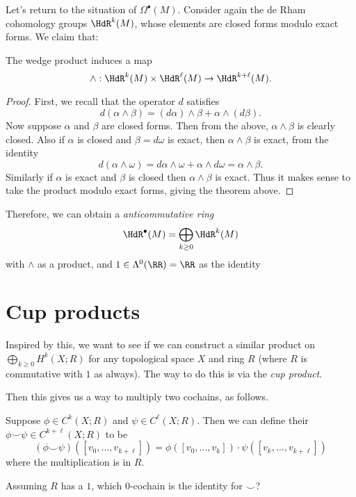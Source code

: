 Let's return to the situation of $\Omega^\bullet(M)$.
Consider again the de Rham cohomology groups $\HdR^k(M)$,
whose elements are closed forms modulo exact forms.
We claim that:
\begin{lemma}
	The wedge product induces a map
	\[ \wedge : \HdR^k(M) \times \HdR^\ell(M) \to \HdR^{k+\ell}(M). \]
\end{lemma}
\begin{proof}
	First, we recall that the operator $d$ satisfies
	\[
		d(\alpha \wedge \beta)
		= (d\alpha) \wedge \beta + \alpha \wedge (d\beta).
	\]
	Now suppose $\alpha$ and $\beta$ are closed forms.
	Then from the above, $\alpha \wedge \beta$ is clearly closed.
	Also if $\alpha$ is closed and $\beta = d\omega$ is exact,
	then $\alpha \wedge \beta$ is exact, from the identity
	\[ d(\alpha \wedge \omega)
		= d\alpha \wedge\omega + \alpha \wedge d\omega = \alpha \wedge \beta. \]
	Similarly if $\alpha$ is exact and $\beta$ is closed
	then $\alpha \wedge \beta$ is exact.
	Thus it makes sense to take the product modulo exact forms,
	giving the theorem above.
\end{proof}

Therefore, we can obtain a \emph{anticommutative ring}
\[ \HdR^\bullet(M) = \bigoplus_{k \ge 0} \HdR^k(M) \]
with $\wedge$ as a product, and $1 \in \Lambda^0(\RR) = \RR$ as the identity

\section{Cup products}
Inspired by this, we want to see if we can construct a similar product
on $\bigoplus_{k \ge 0} H^k(X; R)$ for any topological space $X$ and ring $R$
(where $R$ is commutative with $1$ as always).
The way to do this is via the \emph{cup product}.

Then this gives us a way to multiply two cochains, as follows.
\begin{definition}
	Suppose $\phi \in C^k(X;R)$ and $\psi \in C^\ell(X;R)$.
	Then we can define their 
	$\phi\smile\psi \in C^{k+\ell}(X;R)$ to be
	\[
		(\phi\smile\psi)([v_0, \dots, v_{k+\ell}])
		=
		\phi\left( [v_0, \dots, v_k] \right)
		\cdot
		\psi\left( [v_k, \dots, v_{k+\ell}] \right)
	\]
	where the multiplication is in $R$.
\end{definition}

\begin{ques}
	Assuming $R$ has a $1$, which $0$-cochain is the identity for $\smile$?
\end{ques}

